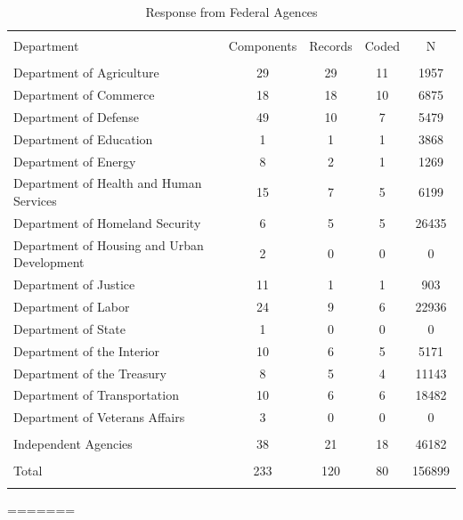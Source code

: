 \documentclass{article}
\begin{document}
\begin{table}[!htbp] \centering 
  \caption{Response from Federal Agences} 
  \label{responserates} 
\begin{tabular}{@{\extracolsep{5pt}} lcccc} 
\\[-1.8ex]\hline 
\hline \\[-1.8ex] 
Department & Components & Records & Coded & N \\ 
\hline \\[-1.8ex] 
Department of Agriculture & 29 & 29 & 11 & 1957 \\ 
Department of Commerce & 18 & 18 & 10 & 6875 \\ 
Department of Defense & 49 & 10 & 7 & 5479 \\ 
Department of Education & 1 & 1 & 1 & 3868 \\ 
Department of Energy & 8 & 2 & 1 & 1269 \\ 
Department of Health and Human Services & 15 & 7 & 5 & 6199 \\ 
Department of Homeland Security & 6 & 5 & 5 & 26435 \\ 
Department of Housing and Urban Development & 2 & 0 & 0 & 0 \\ 
Department of Justice & 11 & 1 & 1 & 903 \\ 
Department of Labor & 24 & 9 & 6 & 22936 \\ 
Department of State & 1 & 0 & 0 & 0 \\ 
Department of the Interior & 10 & 6 & 5 & 5171 \\ 
Department of the Treasury & 8 & 5 & 4 & 11143 \\ 
Department of Transportation & 10 & 6 & 6 & 18482 \\ 
Department of Veterans Affairs & 3 & 0 & 0 & 0 \\ 
\hline \\[-1.8ex] 
Independent Agencies & 38 & 21 & 18 & 46182 \\ 
\hline \\[-1.8ex] 
Total & 233 & 120 & 80 & 156899 \\ 
\hline \\[-1.8ex] 
\end{tabular} 
\end{table} 
=======
\end{document}
